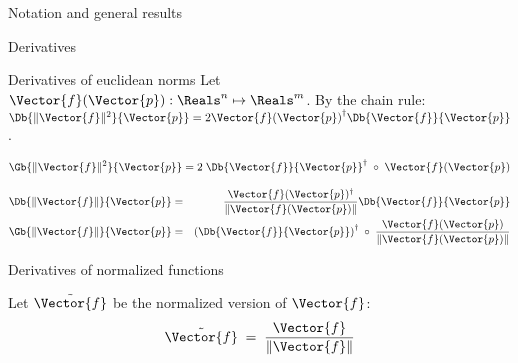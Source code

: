 \begin{plSection}{Notation and general results}
\begin{plSection}{Derivatives}
\begin{plSection}{Derivatives of euclidean norms}
Let $\Vector{f}(\Vector{p}) : \Reals^n \mapsto \Reals^m$.
By the chain rule:
$\Db{\| \Vector{f} \|^2}{\Vector{p}}  =  2 {\Vector{f}(\Vector{p})}^{\dagger} \Db{\Vector{f}}{\Vector{p}} $.

\begin{equation}
\Gb{\| \Vector{f} \|^2}{\Vector{p}}  = 
 2 \;\Db{\Vector{f}}{\Vector{p}}^\dagger \;\circ \;\Vector{f}(\Vector{p})
\end{equation}

\begin{eqnarray}
\label{eq:norm_derivative}
\Db{\| \Vector{f} \|}{\Vector{p}}
& = &
{{\Vector{f}(\Vector{p})^\dagger} \over {\| \Vector{f}(\Vector{p}) \|}} \Db{\Vector{f}}{\Vector{p}}  \\
\Gb{\| \Vector{f} \|}{\Vector{p}}
& = &
\left(\Db{\Vector{f}}{\Vector{p}}\right)^\dagger \;\circ \;{{\Vector{f}(\Vector{p})} \over { \| \Vector{f}(\Vector{p})  \|}}
\label{eq:norm_gradient}
\end{eqnarray}

\end{plSection}%
\begin{plSection}{Derivatives of normalized functions}
\label{sec:Derivatives-of-normalized-functions}

Let $\tilde{\Vector{f}}$ be the normalized version of $\Vector{f}$:
\begin{equation}
\tilde{\Vector{f}} \;= \;{{\Vector{f}} \over {\| \Vector{f} \|}}
\end{equation}


\end{plSection}
\end{plSection}
\end{plSection}
